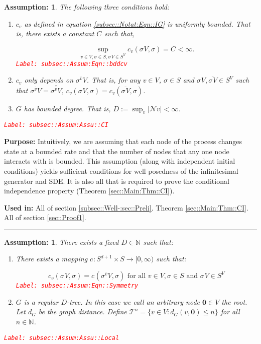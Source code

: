 \documentclass[12pt]{article}
\newcommand{\mb}{\mathbb}
\newcommand{\mc}{\mathcal}
\newcommand{\ra}{\rightarrow}
\newcommand{\ov}{\overline}
\newcommand{\te}{\text}
\newcommand{\tr}{\textcolor{red}}
\newcommand{\labe}[1]{\tr{\texttt{Label: #1}}}
\newcommand{\purpose}{\textbf{Purpose: }}
\newcommand{\usein}{\textbf{Used in: }}
\newcommand{\lin}{\rule{\linewidth}{0.4 pt}}
\newcommand{\defeq}{:=}								%
\newcommand{\neigh}{\mc{N}}					%
\renewcommand{\root}{\mathbf{0}}				%
\renewcommand{\v}{v}							%
\newcommand{\cl}{\ov}							%
\renewcommand{\S}{S}							%
\newcommand{\s}{\sigma}							%
\newcommand{\sv}[1]{\s^{#1}}					%
\newcommand{\degr}{D}								%
\newcommand{\tree}{\mc{T}}							%
\renewcommand{\G}{G}								%
\newcommand{\V}{V}									%
\newcommand{\numb}{n}								%
\newcommand{\XState}[1]{\S^{#1}}				%
\newcommand{\IGr}[1]{c_{#1}}						%
\newcommand{\gdist}{d_G}							%
\newcommand{\const}[1]{C_{#1}}						%
\newtheorem{assu}[thms]{Assumption: }
\begin{document}
\begin{assu}
The following three conditions hold:
\begin{enumerate}
\item \(\IGr{\v}\) as defined in equation \eqref{subsec::Notat:Eqn::IG} is uniformly bounded. That is, there exists a constant \(\const{}\) such that,

\begin{equation}
\sup_{\v\in \V,\s \in \S,\sv{}{\V}\in \S^\V} \IGr{\v}(\sv{}{\V},\s) = \const{} < \infty.
\label{subsec::Assum:Eqn::bddcv}
\end{equation}
\labe{subsec::Assum:Eqn::bddcv}

\item \(\IGr{\v}\) only depends on \(\sv{\cl{\v}}{\V}\). That is, for any \(\v\in \V\), \(\s\in \S\) and \(\sv{}{\V},\ov{\sv{}{\V}} \in \S^\V\) such that \(\sv{\cl{\v}}{\V} = \ov{\sv{\cl{\v}}{\V}}\), \(\IGr{\v}(\sv{}{\V},\s) = \IGr{\v}(\ov{\sv{}{\V}},\s)\).

\item \(\G\) has bounded degree. That is, \(\degr \defeq \sup_\v |\neigh{\v}| < \infty\).
\end{enumerate}
\label{subsec::Assum:Assu::CI}\labe{subsec::Assum:Assu::CI}
\end{assu}

\purpose Intuitively, we are assuming that each node of the process changes state at a bounded rate and that the number of nodes that any one node interacts with is bounded. This assumption (along with independent initial conditions) yields sufficient conditions for well-posedness of the infinitesimal generator and SDE. It is also all that is required to prove the conditional independence property (Theorem \ref{sec::Main:Thm::CI}). 

\usein All of section \ref{subsec::Well-:sec::Preli}. Theorem \ref{sec::Main:Thm::CI}. All of section \ref{sec::Proof1}.

\lin

\begin{assu}
There exists a fixed \(\degr\in \mb{N}\) such that:

\begin{enumerate}
\item There exists a mapping \(\IGr{}: \S^{d+1} \times \S \ra [0,\infty)\) such that:

\begin{equation}
\IGr{\v}(\sv{}{\V},\s) = \IGr{}(\sv{\cl{\v}}{\V},\s) \te{ for all } \v\in \V, \s\in \S\te{ and } \sv{}{\V} \in \S^\V
\label{subsec::Assum:Eqn::Symmetry}
\end{equation}
\labe{subsec::Assum:Eqn::Symmetry}

\item \(\G\) is a regular \(\degr\)-tree. In this case we call an arbitrary node \(\root\in \V\) the root. Let \(\gdist\) be the graph distance. Define \(\tree^\numb = \{\v \in \V: \gdist(\v,\root) \leq \numb\}\) for all \(\numb\in \mb{N}\).
\end{enumerate}
\label{subsec::Assum:Assu::Local}\labe{subsec::Assum:Assu::Local}
\end{assu}
\end{document}
